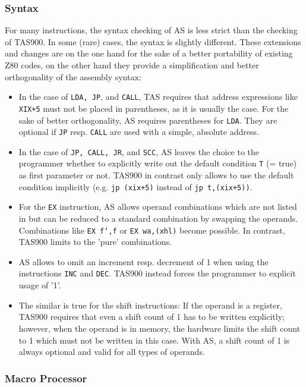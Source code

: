 \documentclass[12pt,twoside]{report}
\newcommand{\tty}[1]{{\tt #1}}
\newcommand{\asname}{{AS}}
\begin{document}
\subsubsection{Syntax}

For many instructions, the syntax checking of \asname{} is less strict than
the checking of TAS900.  In some (rare) cases, the syntax is slightly
different.  These extensions and changes are on the one hand for the
sake of a better portability of existing Z80 codes, on the other hand
they provide a simplification and better orthogonality of the
assembly syntax:
\begin{itemize}
\item{In the case of \tty{LDA, JP}, and \tty{CALL}, TAS requires that address
      expressions like \tty{XIX+5} must not be placed in parentheses, as it
      is usually the case.  For the sake of better orthogonality, \asname{}
      requires parentheses for \tty{LDA}.  They are optional if \tty{JP} resp.
      \tty{CALL} are used with a simple, absolute address.}
\item{In the case of \tty{JP, CALL, JR}, and \tty{SCC}, \asname{} leaves the choice to the
      programmer whether to explicitly write out the default condition
      \tty{T} (= true) as first parameter or not.  TAS900 in contrast only
      allows to use the default condition implicitly (e.g. \tty{jp (xix+5)}
      instead of \tty{jp t,(xix+5))}.}
\item{For the \tty{EX} instruction, \asname{} allows operand combinations which are
      not listed in \cite{Tosh900} but can be reduced to a standard
      combination by swapping the operands.  Combinations like \tty{EX f`,f}
      or \tty{EX wa,(xhl)} become possible.  In contrast, TAS900 limits to
      the 'pure' combinations.}
\item{\asname{} allows to omit an increment resp. decrement of 1 when using the
      instructions \tty{INC} and \tty{DEC}.  TAS900 instead forces the programmer to
      explicit usage of '1'.}
\item{The similar is true for the shift instructions: If the operand is
      a register, TAS900 requires that even a shift count of 1 has to
      be written explicitly; however, when the operand is in memory,
      the hardware limits the shift count to 1 which must not be written
      in this case.  With \asname{}, a shift count of 1 is always optional and
      valid for all types of operands.}
\end{itemize}

\subsubsection{Macro Processor}
\end{document}
